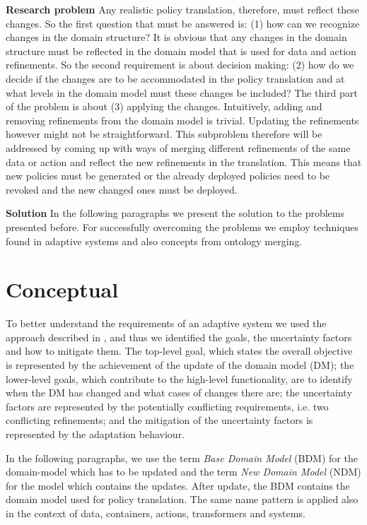 \documentclass{sig-alternate}
\begin{document}
\textbf{Research problem} 
Any realistic policy translation, therefore, must reflect these changes. 
So the first question that must be answered is: (1) how can we recognize changes in the domain structure? 
It is obvious that any changes in the domain structure must be reflected in the domain model that is used for data and action refinements. 
So the second requirement is about decision making: (2) how do we decide if the changes are to be accommodated in the policy translation
and at what levels in the domain model must these changes be included? 
The third part of the problem is about (3) applying the changes. Intuitively, adding and removing refinements from the domain model is trivial. 
Updating the refinements however might not be straightforward.
This subproblem therefore will be addressed by coming up with ways of merging different refinements of the same data or action and reflect the new refinements in the translation. 
This means that new policies must be generated or the already deployed policies need to be revoked and the new changed ones must be deployed.

\textbf{Solution} 
In the following paragraphs we present the solution to the problems presented before. 
For successfully overcoming the problems we employ techniques found in adaptive systems and also concepts from ontology merging. 

\section{Conceptual}

To better understand the requirements of an adaptive system we used the approach described in \cite{proceeding10},
and thus we identified the goals, the uncertainty factors and how to mitigate them. 
The top-level goal, which states the overall objective is represented by the achievement of the update of the domain model (DM); 
the lower-level goals, which contribute to the high-level functionality, are to identify when the DM has changed and what cases of changes there are; 
the uncertainty factors are represented by the potentially conflicting requirements, i.e. two conflicting refinements; 
and the mitigation of the uncertainty factors is represented by the adaptation behaviour.

In the following paragraphs, we use the term \textit{Base Domain Model} (BDM) for the domain-model which has to be updated
and the term \textit{New Domain Model} (NDM) for the model which contains the updates.
After update, the BDM contains the domain model used for policy translation.
The same name pattern is applied also in the context of data, containers, actions, transformers and systems.
\end{document}
